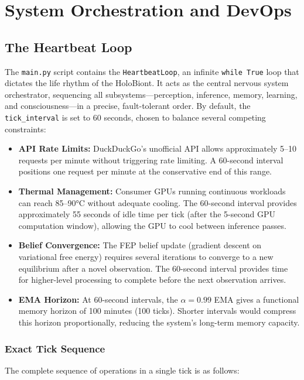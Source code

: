 \chapter{System Orchestration and DevOps}

\section{The Heartbeat Loop}

The \texttt{main.py} script contains the \texttt{HeartbeatLoop}, an infinite \texttt{while True} loop that dictates the life rhythm of the HoloBiont. It acts as the central nervous system orchestrator, sequencing all subsystems---perception, inference, memory, learning, and consciousness---in a precise, fault-tolerant order. By default, the \texttt{tick\_interval} is set to 60 seconds, chosen to balance several competing constraints:

\begin{itemize}
    \item \textbf{API Rate Limits:} DuckDuckGo's unofficial API allows approximately 5--10 requests per minute without triggering rate limiting. A 60-second interval positions one request per minute at the conservative end of this range.
    \item \textbf{Thermal Management:} Consumer GPUs running continuous workloads can reach 85--90°C without adequate cooling. The 60-second interval provides approximately 55 seconds of idle time per tick (after the 5-second GPU computation window), allowing the GPU to cool between inference passes.
    \item \textbf{Belief Convergence:} The FEP belief update (gradient descent on variational free energy) requires several iterations to converge to a new equilibrium after a novel observation. The 60-second interval provides time for higher-level processing to complete before the next observation arrives.
    \item \textbf{EMA Horizon:} At 60-second intervals, the $\alpha = 0.99$ EMA gives a functional memory horizon of 100 minutes (100 ticks). Shorter intervals would compress this horizon proportionally, reducing the system's long-term memory capacity.
\end{itemize}

\subsection{Exact Tick Sequence}

The complete sequence of operations in a single tick is as follows:

